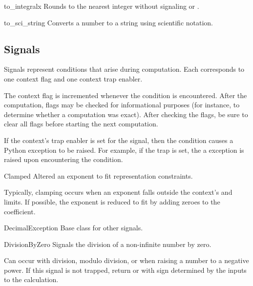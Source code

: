 \begin{methoddesc}{to_integral}{x}                  
  Rounds to the nearest integer without signaling 
  or .                                        
\end{methoddesc} 

\begin{methoddesc}{to_sci_string}{}
  Converts a number to a string using scientific notation.
\end{methoddesc} 



\subsection{Signals \label{decimal-signals}}

Signals represent conditions that arise during computation.
Each corresponds to one context flag and one context trap enabler.

The context flag is incremented whenever the condition is encountered.
After the computation, flags may be checked for informational
purposes (for instance, to determine whether a computation was exact).
After checking the flags, be sure to clear all flags before starting
the next computation.

If the context's trap enabler is set for the signal, then the condition
causes a Python exception to be raised.  For example, if the
 trap is set, the a 
exception is raised upon encountering the condition.


\begin{classdesc*}{Clamped}
    Altered an exponent to fit representation constraints.

    Typically, clamping occurs when an exponent falls outside the context's
     and  limits.  If possible, the exponent is
    reduced to fit by adding zeroes to the coefficient.
\end{classdesc*}

\begin{classdesc*}{DecimalException}
    Base class for other signals.
\end{classdesc*}

\begin{classdesc*}{DivisionByZero}
    Signals the division of a non-infinite number by zero.

    Can occur with division, modulo division, or when raising a number to
    a negative power.  If this signal is not trapped, return
     or  with sign determined by
    the inputs to the calculation.
\end{classdesc*}

